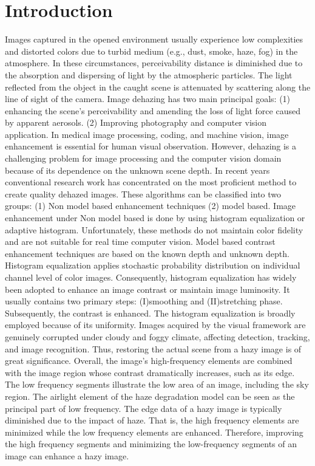 \documentclass[doctor,english,listoffigures,listoftables]{thesis-uestc}
\begin{document}
\section{Introduction}
Images captured in the opened environment usually experience low complexities and distorted colors due to turbid medium (e.g., dust, smoke, haze, fog) in the atmosphere. In these circumstances, perceivability distance is diminished due to the absorption and dispersing of light by the atmospheric particles. The light reflected from the object in the caught scene is attenuated by scattering along the line of sight of the camera. Image dehazing has two main principal goals: (1) enhancing the scene's perceivability and amending the loss of light force caused by apparent aerosols. (2) Improving photography and computer vision application. In medical image processing, coding, and machine vision, image enhancement is essential for human visual observation.
However, dehazing is a challenging problem for image processing and the computer vision domain because of its dependence on the unknown scene depth. In recent years conventional research work has concentrated on the most proficient method to create quality dehazed images.  These algorithms can be classified into two groups: (1) Non model based enhancement techniques (2) model based. Image enhancement under Non model based is done by using histogram equalization or adaptive histogram. Unfortunately, these methods do not maintain color fidelity and are not suitable for real time computer vision. Model based contrast enhancement techniques are based on the known depth and unknown depth. Histogram equalization applies stochastic probability distribution on individual channel level of color images. Consequently, histogram equalization has widely been adopted to enhance an image contrast or maintain image luminosity. It usually contains two primary steps: (I)smoothing and (II)stretching phase. Subsequently, the contrast is enhanced. The histogram equalization is broadly employed because of its uniformity. Images acquired by the visual framework are genuinely corrupted under cloudy and foggy climate, affecting detection, tracking, and image recognition. Thus, restoring the actual scene from a hazy image is of great significance.  
Overall, the image's high-frequency elements are combined with the image region whose contrast dramatically increases, such as its edge. The low frequency segments illustrate the low area of an image, including the sky region. The airlight element of the haze degradation model can be seen as the principal part of low frequency. The edge data of a hazy image is typically diminished due to the impact of haze. That is, the high frequency elements are minimized while the low frequency elements are enhanced. Therefore, improving the high frequency segments and minimizing the low-frequency segments of an image can enhance a hazy image.
\end{document}
